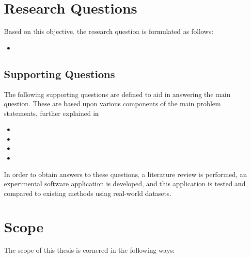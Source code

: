 \section{Research Questions}
Based on this objective, the research question is formulated as follows: 
\begin{itemize}[ ]
  \item \myMainRQ
\end{itemize}

\subsection*{Supporting Questions}
The following supporting questions are defined to aid in answering the main question.
These are based upon various components of the main problem statements, further explained in 
\begin{itemize}[-]
  \item \mySubRQOne
  \item \mySubRQTwo
  \item \mySubRQThree
  \item \mySubRQFour
\end{itemize}
In order to obtain answers to these questions, a literature review is performed,
an experimental software application is developed, 
and this application is tested and compared to existing methods using real-world datasets.




\newpage
\section{Scope}
The scope of this thesis is cornered in the following ways: 

